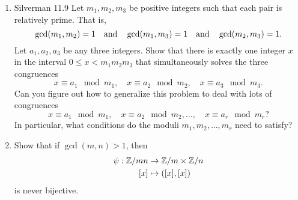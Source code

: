 \documentclass[10pt,twoside]{article}
\begin{document}
\begin{enumerate}[itemsep=2em,label=\Alph*.]
    \item Silverman 11.9 Let $m_1,m_2,m_3$ be positive integers such that each pair is relatively prime. That is,
        \[\gcd(m_1,m_2)=1 \quad \textnormal{and} \quad \gcd(m_1,m_3)=1 \quad \textnormal{and} \quad \gcd(m_2,m_3)=1.\]
  Let $a_1,a_2,a_3$ be any three integers. Show that there is exactly one integer $x$ in the interval $0 \leq x < m_1m_2m_3$ that simultaneously solves the three congruences
        \[x \equiv a_1 \mod{m_1}, \quad x \equiv a_2 \mod{m_2}, \quad x \equiv a_3 \mod{m_3}.\]
Can you figure out how to generalize this problem to deal with lots of congruences
        \[x \equiv a_1 \mod{m_1}, \quad x \equiv a_2 \mod{m_2}, \ldots, \quad x \equiv a_r \mod{m_r}?\]
   In particular, what conditions do the moduli $m_1,m_2, \ldots,m_r$ need to satisfy? 
    \item Show that if $\gcd(m,n)>1$, then
        \begin{align*}
            \psi: \mathbb{Z} / mn &\to \mathbb{Z} /m \times \mathbb{Z} /n
            \\ [x] &\mapsto ([x],[x])
        \end{align*}
is never bijective.        


\end{enumerate}
\end{document}

